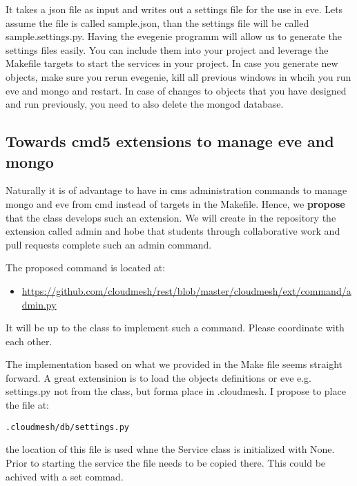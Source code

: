 It takes a json file as input and writes out a settings file for the use
in eve. Lets assume the file is called sample.json, than the settings
file will be called sample.settings.py. Having the evegenie programm
will allow us to generate the settings files easily. You can include
them into your project and leverage the Makefile targets to start the
services in your project. In case you generate new objects, make sure
you rerun evegenie, kill all previous windows in whcih you run eve and
mongo and restart. In case of changes to objects that you have designed
and run previously, you need to also delete the mongod database.

\subsection{Towards cmd5 extensions to manage eve and
mongo}\label{towards-cmd5-extensions-to-manage-eve-and-mongo}

Naturally it is of advantage to have in cms administration commands to
manage mongo and eve from cmd instead of targets in the Makefile. Hence,
we \textbf{propose} that the class develops such an extension. We will
create in the repository the extension called admin and hobe that
students through collaborative work and pull requests complete such an
admin command.

The proposed command is located at:

\begin{itemize}
\tightlist
\item
 \url{https://github.com/cloudmesh/rest/blob/master/cloudmesh/ext/command/admin.py}
\end{itemize}

It will be up to the class to implement such a command. Please
coordinate with each other.

The implementation based on what we provided in the Make file seems
straight forward. A great extensinion is to load the objects definitions
or eve e.g. settings.py not from the class, but forma place in
.cloudmesh. I propose to place the file at:

\begin{verbatim}
.cloudmesh/db/settings.py
\end{verbatim}

the location of this file is used whne the Service class is initialized
with None. Prior to starting the service the file needs to be copied
there. This could be achived with a set commad.
